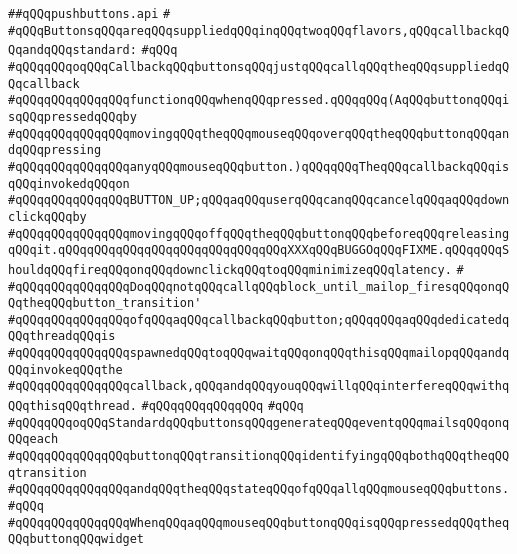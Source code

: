 \label{src/lib/x-kit/widget/old/leaf/pushbuttons.api}
\verb|##qQQqpushbuttons.api|\newline
\verb|#|\newline
\verb|#qQQqButtonsqQQqareqQQqsuppliedqQQqinqQQqtwoqQQqflavors,qQQqcallbackqQQqandqQQqstandard:|\newline
\verb|#qQQq|\newline
\verb|#qQQqqQQqoqQQqCallbackqQQqbuttonsqQQqjustqQQqcallqQQqtheqQQqsuppliedqQQqcallback|\newline
\verb|#qQQqqQQqqQQqqQQqfunctionqQQqwhenqQQqpressed.qQQqqQQq(AqQQqbuttonqQQqisqQQqpressedqQQqby|\newline
\verb|#qQQqqQQqqQQqqQQqmovingqQQqtheqQQqmouseqQQqoverqQQqtheqQQqbuttonqQQqandqQQqpressing|\newline
\verb|#qQQqqQQqqQQqqQQqanyqQQqmouseqQQqbutton.)qQQqqQQqTheqQQqcallbackqQQqisqQQqinvokedqQQqon|\newline
\verb|#qQQqqQQqqQQqqQQqBUTTON_UP;qQQqaqQQquserqQQqcanqQQqcancelqQQqaqQQqdownclickqQQqby|\newline
\verb|#qQQqqQQqqQQqqQQqmovingqQQqoffqQQqtheqQQqbuttonqQQqbeforeqQQqreleasingqQQqit.qQQqqQQqqQQqqQQqqQQqqQQqqQQqqQQqXXXqQQqBUGGOqQQqFIXME.qQQqqQQqShouldqQQqfireqQQqonqQQqdownclickqQQqtoqQQqminimizeqQQqlatency.|\newline
\verb|#|\newline
\verb|#qQQqqQQqqQQqqQQqDoqQQqnotqQQqcallqQQqblock_until_mailop_firesqQQqonqQQqtheqQQqbutton_transition'|\newline
\verb|#qQQqqQQqqQQqqQQqofqQQqaqQQqcallbackqQQqbutton;qQQqqQQqaqQQqdedicatedqQQqthreadqQQqis|\newline
\verb|#qQQqqQQqqQQqqQQqspawnedqQQqtoqQQqwaitqQQqonqQQqthisqQQqmailopqQQqandqQQqinvokeqQQqthe|\newline
\verb|#qQQqqQQqqQQqqQQqcallback,qQQqandqQQqyouqQQqwillqQQqinterfereqQQqwithqQQqthisqQQqthread.|\newline
\verb|#qQQqqQQqqQQqqQQq|\newline
\verb|#qQQq|\newline
\verb|#qQQqqQQqoqQQqStandardqQQqbuttonsqQQqgenerateqQQqeventqQQqmailsqQQqonqQQqeach|\newline
\verb|#qQQqqQQqqQQqqQQqbuttonqQQqtransitionqQQqidentifyingqQQqbothqQQqtheqQQqtransition|\newline
\verb|#qQQqqQQqqQQqqQQqandqQQqtheqQQqstateqQQqofqQQqallqQQqmouseqQQqbuttons.|\newline
\verb|#qQQq|\newline
\verb|#qQQqqQQqqQQqqQQqWhenqQQqaqQQqmouseqQQqbuttonqQQqisqQQqpressedqQQqtheqQQqbuttonqQQqwidget|\newline
